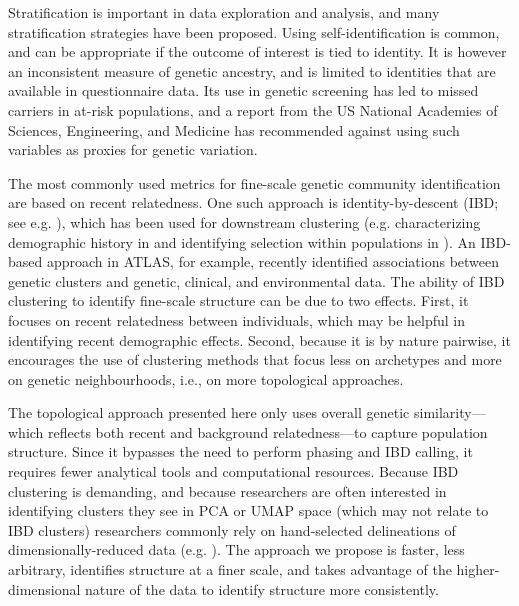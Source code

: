 Stratification is important in data exploration and analysis, and many stratification strategies have been proposed. Using self-identification is common, and can be appropriate if the outcome of interest is tied to identity. It is however an inconsistent measure of genetic ancestry, and is limited to identities that are available in questionnaire data. Its use in genetic screening has led to missed carriers in at-risk populations\citep{kaseniit_genetic_2020}, and a report from the US National Academies of Sciences, Engineering, and Medicine has recommended against using such variables as proxies for genetic variation\citep{committee_2023}. 

The most commonly used metrics for fine-scale genetic community identification are based on recent relatedness. One such approach is identity-by-descent (IBD; see e.g. \citep{freyman_fast_2021,shemirani_rapid_2021,qian_efficient_2014,lawson_inference_2012}), which has been used for downstream clustering (e.g. characterizing demographic history in \citep{han_clustering_2017} and identifying selection within populations in \citep{nait_saada_identity-by-descent_2020}). An IBD-based approach in ATLAS, for example, recently identified associations between genetic clusters and genetic, clinical, and environmental data\citep{caggiano_disease_2023}. The ability of IBD clustering to identify fine-scale structure can be due to two effects. First, it focuses on recent relatedness between individuals, which may be helpful in identifying recent demographic effects. Second, because it is by nature pairwise, it encourages the use of clustering methods that focus less on archetypes and more on genetic neighbourhoods, i.e., on more topological approaches.  

The topological approach presented here only uses overall genetic similarity--- which reflects both recent and background relatedness---to capture population structure. Since it bypasses the need to perform phasing and IBD calling, it requires fewer analytical tools and computational resources. Because IBD clustering is demanding, and because researchers are often interested in identifying clusters they see in PCA or UMAP space (which may not relate to IBD clusters) researchers commonly rely on hand-selected delineations of dimensionally-reduced data (e.g. \citep{halldorsson_sequences_2022,sakaue_dimensionality_2020}). The approach we propose is faster, less arbitrary, identifies structure at a finer scale, and takes advantage of the higher-dimensional nature of the data to identify structure more consistently.

